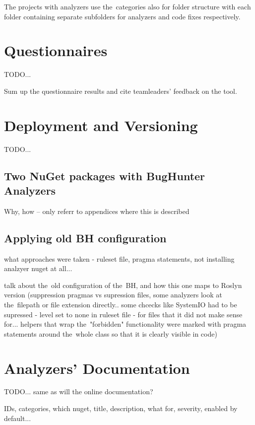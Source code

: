 \documentclass[
  digital, %
  table,   %
  lof,     %
  lot,     %
  oneside,
]{fithesis3}
\begin{document}
The projects with analyzers use the~categories also for folder structure with each folder containing separate subfolders for analyzers and code fixes respectively.
\chapter{Questionnaires}
TODO...

Sum up the questionnaire results and cite teamleaders' feedback on the tool.

\chapter{Deployment and Versioning}
\label{appendix:deployment}
TODO...
\section{Two NuGet packages with BugHunter Analyzers}
Why, how -- only referr to appendices where this is described

\section{Applying old BH configuration}
what approaches were taken - ruleset file, pragma statements, not installing analzyer nuget at all...

talk about the~old configuration of the~BH, and how this one maps to Roslyn version (suppression pragmas vs supression files, some analyzers look at the~filepath or file extension directly.. some chcecks like SystemIO had to be supressed - level set to none in ruleset file - for files that it did not make sense for... helpers that wrap the~"forbidden" functionality were marked with pragma statements around the~whole class so that it is clearly visible in code)

\chapter{Analyzers' Documentation}
TODO...
same as will the online documentation?

IDs, categories, which nuget, title, description, what for, severity, enabled by default...
\end{document}
